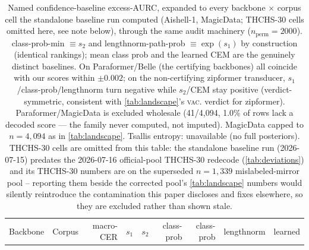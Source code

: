 \documentclass[11pt]{article}
\begin{document}
\begin{table}[t]
  \centering
  \caption{Named confidence-baseline excess-AURC, expanded to every backbone $\times$
  corpus cell the standalone baseline run computed (Aishell-1, MagicData; THCHS-30 cells
  omitted here, see note below), through the same audit machinery ($n_{\mathrm{perm}}{=}2000$).
  class-prob-min $\equiv s_2$ and lengthnorm-path-prob $\equiv \exp(s_1)$ by construction
  (identical rankings); mean class prob and the learned CEM are the genuinely distinct
  baselines. On Paraformer/Belle (the certifying backbones) all coincide with our scores
  within $\pm0.002$; on the non-certifying zipformer transducer, $s_1$/class-prob/lengthnorm
  turn negative while $s_2$/CEM stay positive (verdict-symmetric, consistent with
  \cref{tab:landscape}'s \textsc{vac.} verdict for zipformer). Paraformer/MagicData is
  excluded wholesale (41/4{,}094, 1.0\% of rows lack a decoded score --- the family never
  computed, not imputed). MagicData capped to $n{=}4{,}094$ as in \cref{tab:landscape}.
  Tsallis entropy: unavailable (no full posteriors). THCHS-30 cells are omitted from this
  table: the standalone baseline run (2026-07-15) predates the 2026-07-16 official-pool
  THCHS-30 redecode (\cref{tab:deviations}) and its THCHS-30 numbers are on the superseded
  $n{=}1{,}339$ mislabeled-mirror pool -- reporting them beside the corrected pool's
  \cref{tab:landscape} numbers would silently reintroduce the contamination this paper
  discloses and fixes elsewhere, so they are excluded rather than shown stale.}
  \label{tab:baselines}
  \small
  \setlength{\tabcolsep}{2pt}
  \begin{tabular}{l l r r r r r r r}
    \toprule
    Backbone & Corpus & macro-CER & $s_1$ & $s_2$ & class-prob & class-prob & lengthnorm & learned \\

\end{tabular}
\end{table}
\end{document}
